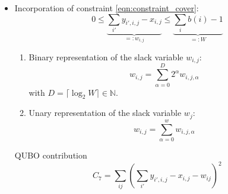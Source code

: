 \documentclass{article}
\begin{document}
\begin{itemize}
\begin{equation*}
    \end{equation*}
\item Incorporation of constraint \eqref{eqn:constraint_cover}:
    \begin{equation*}
        0 \leq \underbrace{\sum_{i'} y_{i', i, j} - x_{i, j}}_{=:w_{i, j}} \leq \underbrace{\sum_i b(i) - 1}_{=:W}
    \end{equation*}
    \begin{enumerate}
        \item 
        Binary representation of the slack variable $w_{i, j}$:
        \begin{equation*}
            w_{i, j} = \sum_{\alpha = 0}^{D} 2^\alpha w_{i, j, \alpha}
        \end{equation*}
        with $D = \lceil \log_2 W \rceil \in \mathbb{N}$.
        \item 
        Unary representation of the slack variable $w_j$:
        \begin{equation*}
            w_{i, j} = \sum_{\alpha = 0}^{w} w_{i, j, \alpha}
        \end{equation*}
    \end{enumerate}
    QUBO contribution
    \begin{equation*}
        C_7 = \sum_{ij} \left(\sum_{i'} y_{i', i, j} - x_{i, j} -  w_{ij} \right)^2
    \end{equation*}
\end{itemize}
\end{document}
